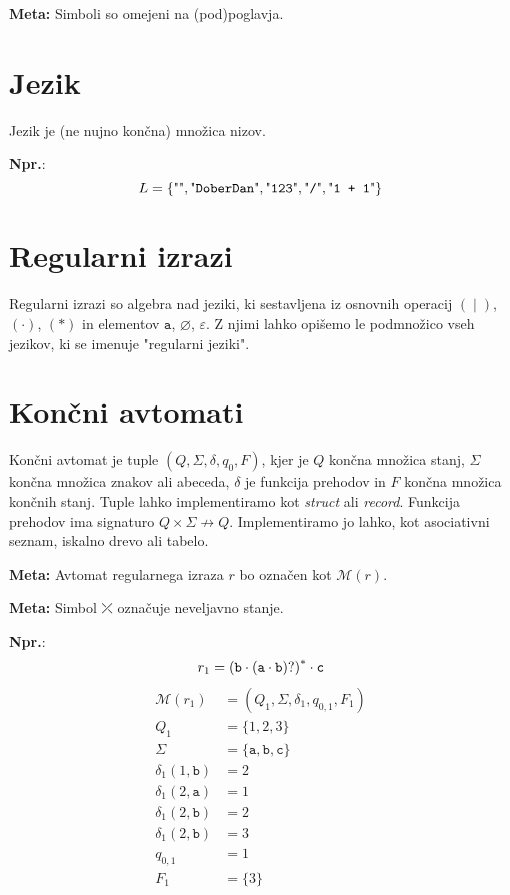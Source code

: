 \documentclass{article}
\newcommand{\Ex}{\textbf{Npr.}:\ }
\newcommand{\Special}[1]{\textbf{#1}}
\newcommand{\Empty}{\varnothing}
\newcommand{\Null}{\varepsilon}
\newcommand{\Alphabet}{\Sigma}
\newcommand{\Automaton}[1]{\mathcal{M}(#1)}
\newcommand{\Str}[1]{\text{\textquotedbl\texttt{#1}\textquotedbl}}
\newcommand{\Char}[1]{\texttt{#1}}
\newcommand{\Seq}{\cdot}
\newcommand{\Union}{\mathrel{|}}
\newcommand{\Kleene}[1]{{#1}^\ast}
\newcommand{\Err}{\rdiagovfdiag}
\begin{document}
\Special{Meta:} Simboli so omejeni na (pod)poglavja.

\section{Jezik}
Jezik je (ne nujno končna) množica nizov.

\Ex
\begin{equation*}
  L = \{\Str{}, \Str{DoberDan}, \Str{123}, \Str{/}, \Str{1 + 1} \}
\end{equation*}

\section{Regularni izrazi}
Regularni izrazi so algebra nad jeziki, ki sestavljena iz osnovnih operacij $(\Union)$, $(\Seq)$, $(\ast)$ in elementov $\Char{a}$, $\Empty$, $\Null$.
Z njimi lahko opišemo le podmnožico vseh jezikov, ki se imenuje "regularni jeziki".

\section{Končni avtomati}

Končni avtomat je tuple $(Q, \Alphabet, \delta, q_0, F)$, kjer je $Q$ končna množica stanj, $\Sigma$ končna množica znakov ali abeceda, $\delta$ je funkcija prehodov in $F$ končna množica končnih stanj.
Tuple lahko implementiramo kot \emph{struct} ali \emph{record}.
Funkcija prehodov ima signaturo $Q \times \Sigma \not\rightarrow Q$.
Implementiramo jo lahko, kot asociativni seznam, iskalno drevo ali tabelo.

\Special{Meta:} Avtomat regularnega izraza $r$ bo označen kot $\Automaton{r}$.

\Special{Meta:} Simbol $\Err$ označuje neveljavno stanje.

\Ex
\begin{equation}
  r_1 = \Kleene{(\Char{b} \Seq (\Char{a} \Seq \Char{b})?)} \Seq \Char{c} \\
\end{equation}
\begin{align*}
  \Automaton{r_1} &= (Q_1, \Sigma, \delta_1, q_{0, 1}, F_1)\\[1em]
  Q_1 &= \{1, 2, 3\} \\[1em]
  \Sigma &= \{\Char{a}, \Char{b}, \Char{c}\} \\[1em]
  \delta_1(1, \Char{b}) & =  2\\
  \delta_1(2, \Char{a}) & =  1\\
  \delta_1(2, \Char{b}) & =  2\\
  \delta_1(2, \Char{b}) & =  3\\[1em]
  q_{0, 1} &= 1 \\[1em]
  F_1 &= \{3\}
\end{align*}
\end{document}
